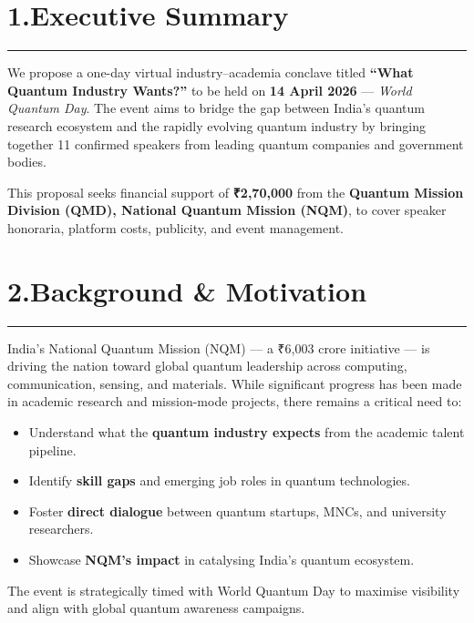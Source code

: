 \documentclass[12pt,a4paper]{article}
\begin{document}
\section*{1.\quad Executive Summary}
\vspace{-4pt}\hrule\vspace{6pt}

We propose a one-day virtual industry--academia conclave titled \textbf{``What Quantum Industry Wants?''} to be held on \textbf{14 April 2026} --- \emph{World Quantum Day}. The event aims to bridge the gap between India's quantum research ecosystem and the rapidly evolving quantum industry by bringing together 11 confirmed speakers from leading quantum companies and government bodies.

This proposal seeks financial support of \textbf{\textrm{₹}2,70,000} from the \textbf{Quantum Mission Division (QMD), National Quantum Mission (NQM)}, to cover speaker honoraria, platform costs, publicity, and event management.

\section*{2.\quad Background \& Motivation}
\vspace{-4pt}\hrule\vspace{6pt}

India's National Quantum Mission (NQM) --- a \textrm{₹}6,003 crore initiative --- is driving the nation toward global quantum leadership across computing, communication, sensing, and materials. While significant progress has been made in academic research and mission-mode projects, there remains a critical need to:

\begin{itemize}
  \item Understand what the \textbf{quantum industry expects} from the academic talent pipeline.
  \item Identify \textbf{skill gaps} and emerging job roles in quantum technologies.
  \item Foster \textbf{direct dialogue} between quantum startups, MNCs, and university researchers.
  \item Showcase \textbf{NQM's impact} in catalysing India's quantum ecosystem.
\end{itemize}

The event is strategically timed with World Quantum Day to maximise visibility and align with global quantum awareness campaigns.
\end{document}

